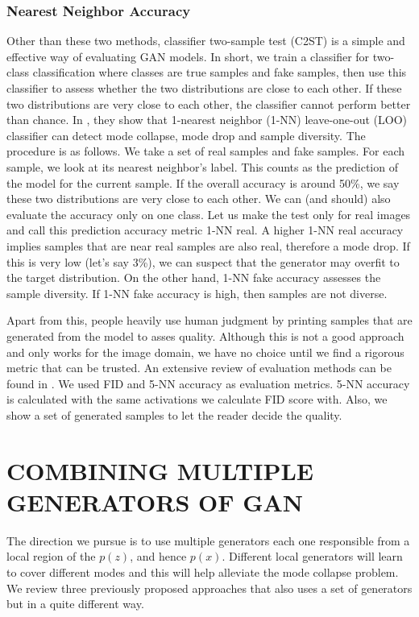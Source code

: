 \documentclass[a4paper,onesided,12pt]{report}
\begin{document}
\subsection{Nearest Neighbor Accuracy}
\label{subsec:nn}
Other than these two methods, classifier two-sample test (C2ST) \cite{lopez2016revisiting} is a simple and effective way of evaluating GAN models. In short, we train a classifier for two-class classification where classes are true samples and fake samples, then use this classifier to assess whether the two distributions are close to each other. If these two distributions are very close to each other, the classifier cannot perform better than chance. In \cite{xu2018empirical}, they show that 1-nearest neighbor (1-NN) leave-one-out (LOO) classifier can detect mode collapse, mode drop and sample diversity. The procedure is as follows. We take a set of real samples and fake samples. For each sample, we look at its nearest neighbor's label. This counts as the prediction of the model for the current sample. If the overall accuracy is around 50\%, we say these two distributions are very close to each other. We can (and should) also evaluate the accuracy only on one class. Let us make the test only for real images and call this prediction accuracy metric 1-NN real. A higher 1-NN real accuracy implies samples that are near real samples are also real, therefore a mode drop. If this is very low (let's say 3\%), we can suspect that the generator may overfit to the target distribution. On the other hand, 1-NN fake accuracy assesses the sample diversity. If 1-NN fake accuracy is high, then samples are not diverse. 

Apart from this, people heavily use human judgment by printing samples that are generated from the model to asses quality. Although this is not a good approach and only works for the image domain, we have no choice until we find a rigorous metric that can be trusted. An extensive review of evaluation methods can be found in \cite{borji2019pros}. We used FID and 5-NN accuracy as evaluation metrics. 5-NN accuracy is calculated with the same activations we calculate FID score with. Also, we show a set of generated samples to let the reader decide the quality.

\chapter{COMBINING MULTIPLE GENERATORS OF GAN}
\label{chapter:multiple_gan}

The direction we pursue is to use multiple generators each one responsible from a local region of the $p(z)$, and hence $p(x)$. Different local generators will learn to cover different modes and this will help alleviate the mode collapse problem. We review three previously proposed approaches that also uses a set of generators but in a quite different way.
\end{document}
